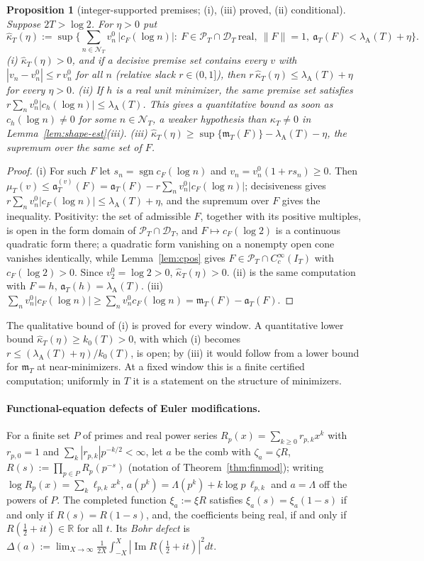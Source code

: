 \documentclass[11pt]{amsart}
\newtheorem{proposition}[theorem]{Proposition}
\theoremstyle{definition}
\theoremstyle{remark}
\newcommand{\R}{\mathbb R}
\newcommand{\Iml}{\operatorname{Im}}
\newcommand{\PT}{\mathcal P_T}
\newcommand{\IT}{I_T}
\newcommand{\lamA}{\lambda_{\mathrm A}(T)}
\newcommand{\NT}{\mathcal N_T}
\newcommand{\mT}{\mathfrak m_T}
\begin{document}
\begin{proposition}[integer-supported premises; (i), (iii) proved, (ii) conditional]\label{prop:geo-int}
Suppose $2T>\log2$. For $\eta>0$ put
\[
\hat\kappa_T(\eta):=\sup\Big\{\sum_{n\in\NT}v^0_n\,|c_F(\log n)|:\ F\in\PT\cap\mathcal D_T\ \text{real},\ \|F\|=1,\ \mathfrak a_T(F)<\lamA+\eta\Big\}.
\]
\emph{(i)} $\hat\kappa_T(\eta)>0$, and if a decisive premise set contains every $v$ with $|v_n-v^0_n|\le r\,v^0_n$ for all $n$
(relative slack $r\in(0,1]$), then $r\,\hat\kappa_T(\eta)\le\lamA+\eta$ for every $\eta>0$.
\emph{(ii)} If $h$ is a real unit minimizer, the same premise set satisfies $r\sum_nv^0_n|c_h(\log n)|\le\lamA$. This gives a
quantitative bound as soon as $c_h(\log n)\ne0$ for some $n\in\NT$, a weaker hypothesis than $\kappa_T\ne0$ in
Lemma~\ref{lem:shape-est}(iii).
\emph{(iii)} $\hat\kappa_T(\eta)\ge\sup\{\mT(F)\}-\lamA-\eta$, the supremum over the same set of $F$.
\end{proposition}
\begin{proof}
(i) For such $F$ let $s_n=\operatorname{sgn}c_F(\log n)$ and $v_n=v^0_n(1+rs_n)\ge0$. Then $\mu_T(v)\le\mathfrak a^{(v)}_T(F)=\mathfrak a_T(F)-r\sum_nv^0_n|c_F(\log n)|$;
decisiveness gives $r\sum_nv^0_n|c_F(\log n)|\le\lamA+\eta$, and the supremum over $F$ gives the inequality. Positivity: the set of
admissible $F$, together with its positive multiples, is open in the form domain of $\PT\cap\mathcal D_T$, and $F\mapsto c_F(\log2)$ is a
continuous quadratic form there; a quadratic form vanishing on a nonempty open cone vanishes identically, while
Lemma~\ref{lem:cpos} gives $F\in\PT\cap C_c^\infty(\IT)$ with $c_F(\log2)>0$. Since $v^0_2=\log2>0$, $\hat\kappa_T(\eta)>0$. (ii) is the same
computation with $F=h$, $\mathfrak a_T(h)=\lamA$. (iii) $\sum_nv^0_n|c_F(\log n)|\ge\sum_nv^0_nc_F(\log n)=\mT(F)-\mathfrak a_T(F)$.
\end{proof}

The qualitative bound of (i) is proved for every window. A quantitative lower bound $\hat\kappa_T(\eta)\ge k_0(T)>0$, with which (i) becomes
$r\le(\lamA+\eta)/k_0(T)$, is open; by (iii) it would follow from a lower bound for $\mT$ at near-minimizers. At a fixed window this is a
finite certified computation; uniformly in $T$ it is a statement on the structure of minimizers.

\paragraph{Functional-equation defects of Euler modifications.}
For a finite set $P$ of primes and real power series $R_p(x)=\sum_{k\ge0}r_{p,k}x^k$ with $r_{p,0}=1$ and
$\sum_k|r_{p,k}|p^{-k/2}<\infty$, let $a$ be the comb with $\zeta_a=\zeta R$, $R(s):=\prod_{p\in P}R_p(p^{-s})$ (notation of
Theorem~\ref{thm:finmod}); writing $\log R_p(x)=\sum_k\ell_{p,k}x^k$, $a(p^k)=\Lambda(p^k)+k\log p\,\ell_{p,k}$ and $a=\Lambda$ off the
powers of $P$. The completed function $\xi_a:=\xi R$ satisfies $\xi_a(s)=\xi_a(1-s)$ if and only if $R(s)=R(1-s)$, and, the coefficients
being real, if and only if $R(\frac12+it)\in\R$ for all $t$. Its \emph{Bohr defect} is
$\Delta(a):=\lim_{X\to\infty}\frac1{2X}\int_{-X}^X|\Iml R(\tfrac12+it)|^2dt$.
\end{document}
